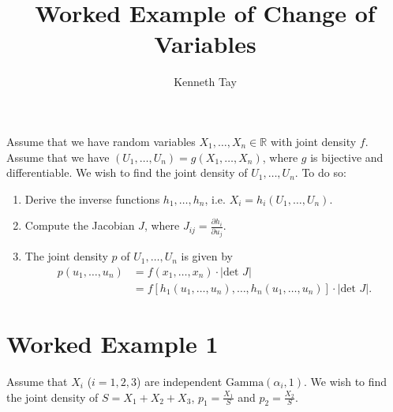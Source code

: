 \documentclass{article}
\newcommand{\dis}{\displaystyle}
\newcommand{\bbR}{\mathbb{R}}
\newcommand{\pd}{\partial}
\begin{document}
\title{Worked Example of Change of Variables}
\author{Kenneth Tay}
\date{\vspace{-3ex}}
\maketitle

Assume that we have random variables $X_1, \dots, X_n \in \bbR$ with joint density $f$. Assume that we have $(U_1, \dots, U_n) = g(X_1, \dots, X_n)$, where $g$ is bijective and differentiable. We wish to find the joint density of $U_1, \dots, U_n$. To do so:

\begin{enumerate}
\item Derive the inverse functions $h_1, \dots, h_n$, i.e. $X_i = h_i(U_1, \dots, U_n)$.

\item Compute the Jacobian $J$, where $J_{ij} = \dis\frac{\pd h_i}{\pd u_j}$.

\item The joint density $p$ of $U_1, \dots, U_n$ is given by \begin{align*}
p(u_1, \dots, u_n) &= f(x_1, \dots, x_n) \cdot |\text{det } J| \\ 
&= f \left[ h_1(u_1, \dots, u_n), \dots, h_n(u_1, \dots, u_n) \right] \cdot |\text{det } J|.
\end{align*}
\end{enumerate}

\section*{Worked Example 1}
Assume that $X_i$ ($i = 1, 2, 3$) are independent $\text{Gamma}(\alpha_i, 1)$. We wish to find the joint density of $S = X_1 + X_2 + X_3$, $p_1 = \dis\frac{X_1}{S}$ and $p_2 = \dis\frac{X_2}{S}$.
\end{document}
